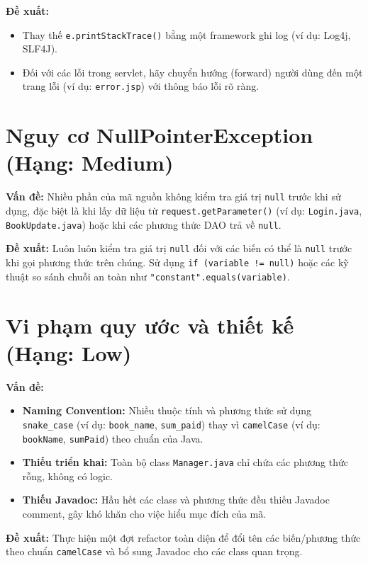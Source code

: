 \textbf{Đề xuất:}
\begin{itemize}
    \item Thay thế \texttt{e.printStackTrace()} bằng một framework ghi log (ví dụ: Log4j, SLF4J).
    \item Đối với các lỗi trong servlet, hãy chuyển hướng (forward) người dùng đến một trang lỗi (ví dụ: \texttt{error.jsp}) với thông báo lỗi rõ ràng.
\end{itemize}

\section{Nguy cơ NullPointerException (Hạng: Medium)}
\textbf{Vấn đề:} Nhiều phần của mã nguồn không kiểm tra giá trị \texttt{null} trước khi sử dụng, đặc biệt là khi lấy dữ liệu từ \texttt{request.getParameter()} (ví dụ: \texttt{Login.java}, \texttt{BookUpdate.java}) hoặc khi các phương thức DAO trả về \texttt{null}.

\textbf{Đề xuất:} Luôn luôn kiểm tra giá trị \texttt{null} đối với các biến có thể là \texttt{null} trước khi gọi phương thức trên chúng. Sử dụng \texttt{if (variable != null)} hoặc các kỹ thuật so sánh chuỗi an toàn như \texttt{"constant".equals(variable)}.

\section{Vi phạm quy ước và thiết kế (Hạng: Low)}
\textbf{Vấn đề:}
\begin{itemize}
    \item \textbf{Naming Convention:} Nhiều thuộc tính và phương thức sử dụng \texttt{snake\_case} (ví dụ: \texttt{book\_name}, \texttt{sum\_paid}) thay vì \texttt{camelCase} (ví dụ: \texttt{bookName}, \texttt{sumPaid}) theo chuẩn của Java.
    \item \textbf{Thiếu triển khai:} Toàn bộ class \texttt{Manager.java} chỉ chứa các phương thức rỗng, không có logic.
    \item \textbf{Thiếu Javadoc:} Hầu hết các class và phương thức đều thiếu Javadoc comment, gây khó khăn cho việc hiểu mục đích của mã.
\end{itemize}

\textbf{Đề xuất:} Thực hiện một đợt refactor toàn diện để đổi tên các biến/phương thức theo chuẩn \texttt{camelCase} và bổ sung Javadoc cho các class quan trọng.

\newpage
